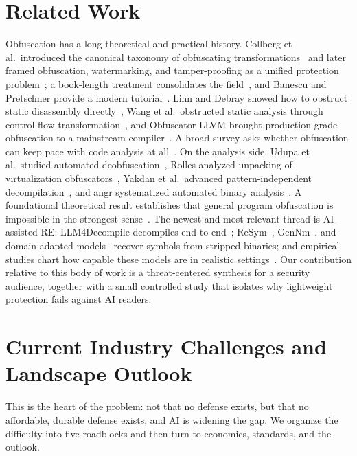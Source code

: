 \documentclass[conference]{IEEEtran}
\begin{document}
\section{Related Work}
Obfuscation has a long theoretical and practical history. Collberg et al.\ introduced
the canonical taxonomy of obfuscating transformations~\cite{obf-taxonomy} and later
framed obfuscation, watermarking, and tamper-proofing as a unified protection
problem~\cite{collberg-tse}; a book-length treatment consolidates the
field~\cite{surreptitious}, and Banescu and Pretschner provide a modern
tutorial~\cite{banescu}. Linn and Debray showed how to obstruct static disassembly
directly~\cite{linn-debray}, Wang et al.\ obstructed static analysis through
control-flow transformation~\cite{wang-tamper}, and Obfuscator-LLVM brought
production-grade obfuscation to a mainstream compiler~\cite{ollvm}. A broad survey
asks whether obfuscation can keep pace with code analysis at
all~\cite{protecting-survey}. On the analysis side, Udupa et al.\ studied automated
deobfuscation~\cite{udupa}, Rolles analyzed unpacking of virtualization
obfuscators~\cite{rolles}, Yakdan et al.\ advanced pattern-independent
decompilation~\cite{nomoregotos}, and angr systematized automated binary
analysis~\cite{angr}. A foundational theoretical result establishes that general
program obfuscation is impossible in the strongest sense~\cite{barak}. The newest
and most relevant thread is AI-assisted RE: LLM4Decompile decompiles end to
end~\cite{llm4decompile}; ReSym~\cite{resym}, GenNm~\cite{gennm}, and domain-adapted
models~\cite{funcname} recover symbols from stripped binaries; and empirical studies
chart how capable these models are in realistic settings~\cite{howfar,empirical}.
Our contribution relative to this body of work is a threat-centered synthesis for a
security audience, together with a small controlled study that isolates why
lightweight protection fails against AI readers.

\section{Current Industry Challenges and Landscape Outlook}
This is the heart of the problem: not that no defense exists, but that no
affordable, durable defense exists, and AI is widening the gap. We organize the
difficulty into five roadblocks and then turn to economics, standards, and the
outlook.
\end{document}
